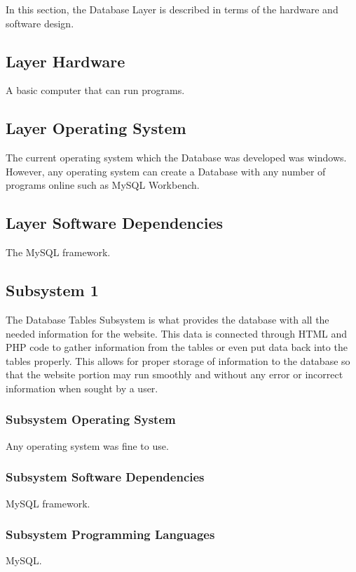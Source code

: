 In this section, the Database Layer is described in terms of the hardware and software design.

\subsection{Layer Hardware}
A basic computer that can run programs.

\subsection{Layer Operating System}
The current operating system which the Database was developed was windows. However, any operating system can create a Database with any number of programs online such as MySQL Workbench.

\subsection{Layer Software Dependencies}
The MySQL framework.

\subsection{Subsystem 1}
The Database Tables Subsystem is what provides the database with all the needed information for the website. This data is connected through HTML and PHP code to gather information from the tables or even put data back into the tables properly. This allows for proper storage of information to the database so that the website portion may run smoothly and without any error or incorrect information when sought by a user.


\subsubsection{Subsystem Operating System}
Any operating system was fine to use.

\subsubsection{Subsystem Software Dependencies}
MySQL framework.

\subsubsection{Subsystem Programming Languages}
MySQL.